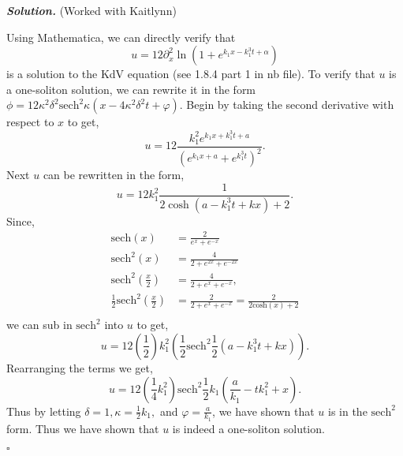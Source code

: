 \documentclass[12pt]{report}
\newenvironment{solution}[1][\it{Solution}]{\textbf{#1. } }{$\square$}
\begin{document}
\begin{solution}
    (Worked with Kaitlynn)

    \noindent
    Using Mathematica, we can directly verify that 
    $$u = 12 \partial_x^2 \ln\left(1 + e^{k_1 x - k_1^3t + \alpha}\right)$$
    is a solution to the KdV equation (see 1.8.4 part 1 in nb file). 
    To verify that $u$ is a one-soliton solution, we can rewrite it in the form $\phi = 12 \kappa^2 \delta^2 \text{sech}^2 \kappa ( x - 4 \kappa^2 \delta^2 t + \varphi )$. 
    Begin by taking the second derivative with respect to $x$ to get,
    $$u = 12 \frac{k_1^2e^{k_1x+k_1^3t+a}}{(e^{k_1x+a}+e^{k_1^3t})^2}.$$ 
    Next $u$ can be rewritten in the form,
    $$u = 12 k_1^2 \frac{1}{2\cosh(a-k_1^3t+kx) + 2}.$$  
    Since,
    \begin{align*}
        \text{sech}(x) &= \frac{2}{e^x+e^{-x}}\\
        \text{sech}^2(x) &= \frac{4}{2+e^{2x}+e^{-2x}}\\
        \text{sech}^2\left(\frac{x}{2}\right) &= \frac{4}{2+e^{x}+e^{-x}},\\
        \frac{1}{2}\text{sech}^2\left(\frac{x}{2}\right) &= \frac{2}{2+e^x+e^{-x}} = \frac{2}{2\text{cosh}(x)+2}\\
    \end{align*} 
    we can sub in $\text{sech}^2$ into $u$ to get, 
    $$u=12\left(\frac{1}{2}\right)k_1^2\left(\frac{1}{2}\text{sech}^2\frac{1}{2}\left(a - k_1^3t + kx \right)\right).$$
    Rearranging the terms we get, 
    $$u=12\left(\frac{1}{4}k_1^2\right)\text{sech}^2\frac{1}{2}k_1\left( \frac{a}{k_1} - tk_1^2 + x\right).$$
    Thus by letting $\delta = 1, \kappa = \frac{1}{2} k_1,$ and $\varphi = \frac{a}{k_1}$, we have shown that $u$ is in the $\text{sech}^2$ form.
    Thus we have shown that $u$ is indeed a one-soliton solution.


\end{solution}
\end{document}
